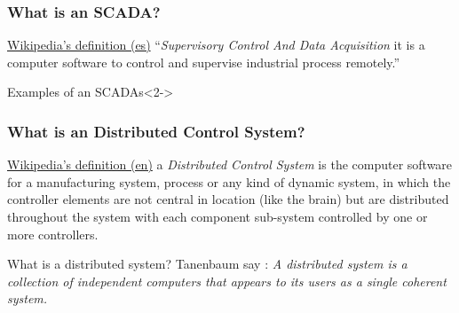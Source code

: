\documentclass{beamer}
\begin{document}
\begin{frame}
\frametitle{What is an SCADA?}
    \begin{block}{\href{http://es.wikipedia.org/wiki/SCADA}{Wikipedia's definition (es)}}
        ``\emph{Supervisory Control And Data Acquisition} it is a computer software to control and supervise industrial process remotely.''
    \end{block}
    \begin{exampleblock}{Examples of an SCADAs}<2->
        \begin{figure}[h]
        \end{figure}
    \end{exampleblock}
\end{frame}

\begin{frame}
\frametitle{What is an Distributed Control System?}
    \begin{block}{\href{http://en.wikipedia.org/wiki/Distributed_control_system}{Wikipedia's definition (en)}}
        a \emph{Distributed Control System} is the computer software for a manufacturing system, process or any kind of dynamic system, in which the controller elements are not central in location (like the brain) but are distributed throughout the system with each component sub-system controlled by one or more controllers.
    \end{block}
    \begin{block}{What is a distributed system?}
        Tanenbaum say \cite{TanenbaumDistr}: \emph{A distributed system is a collection of independent computers that appears to its users as a single coherent system.}
    \end{block}
\end{frame}
\end{document}
